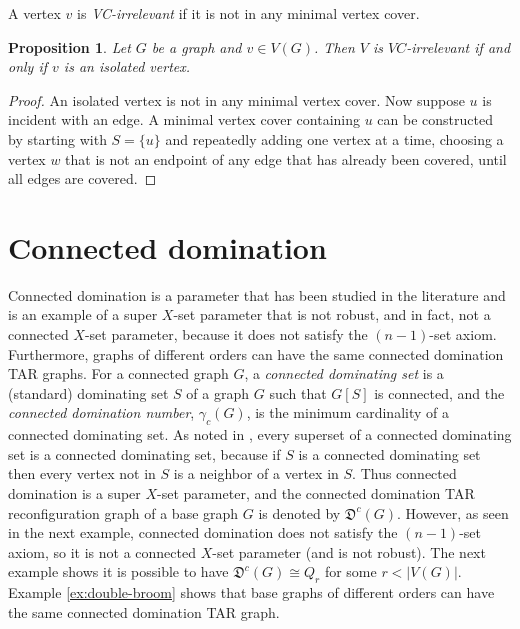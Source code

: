 \documentclass{article}
\numberwithin{figure}{section}
\numberwithin{table}{section}
\numberwithin{equation}{section}
\newtheorem{prop}[thm]{Proposition}
\theoremstyle{definition}
\theoremstyle{definition}
\theoremstyle{definition}
\newcommand{\bpf}{\begin{proof}}
\newcommand{\epf}{\end{proof}\ms}
\newcommand{\ms}{\medskip}
\newcommand{\Dc}{\gamma_c}
\newcommand{\dctar}{\mathfrak{D}^c}%
\begin{document}
{ A vertex $v$ is \emph{VC-irrelevant} if it is not in any minimal vertex cover.  %


\begin{prop} \label{p:vc-irrel}
  Let $G$ be a graph 
  and $v\in V(G)$.  Then $V$ is $VC$-irrelevant if and only if $v$ is an isolated vertex.
\end{prop}
\bpf %
An isolated vertex is not in any minimal vertex cover.  Now suppose $u$ is incident with an edge.  A minimal vertex cover containing $u$ can be  constructed by starting with $S=\{u\}$ and repeatedly adding one vertex at a time, choosing a vertex  $w$ that is not an endpoint of any edge that has already been covered, until all edges are covered. 
\epf


  


\section{Connected domination}\label{s:conD}


Connected domination is a parameter that has been studied in the literature \cite{conn-Dom, conn-Dom-orig} and  is an example of a super $X$-set parameter that is not robust, and in fact, not a connected $X$-set parameter, because it does not satisfy the $(n-1)$-set axiom. Furthermore, graphs of different orders can have the same connected domination TAR graphs.  For a connected graph $G$, a \emph{connected dominating set} is a (standard) dominating set $S$ of a graph $G$ such that $G[S]$ is connected, and the \emph{connected domination number}, $\Dc(G)$, is the minimum cardinality of a connected dominating set.  
As noted in \cite{conn-Dom},  every superset of a connected dominating set is a connected dominating set, because if $S$ is a connected dominating set then  every vertex not in $S$  is a neighbor of a vertex in $S$. Thus connected domination is a super $X$-set parameter, and the connected domination TAR reconfiguration graph of a base graph $G$ is denoted by $\dctar(G)$.  However, as seen in the next example, connected domination does not satisfy the $(n-1)$-set axiom, so it is not  a connected $X$-set parameter (and is not robust). The next example shows it is possible to have $\dctar(G)\cong Q_r$ for some $r<|V(G)|$. Example \ref{ex:double-broom} shows that base graphs of different orders can have the same connected domination TAR graph.

}
\end{document}
